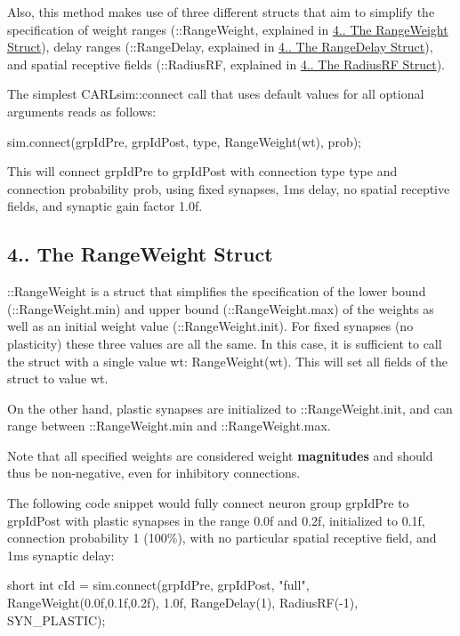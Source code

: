 Also, this method makes use of three different structs that aim to simplify the specification of weight ranges (\+::\+Range\+Weight, explained in \hyperlink{ch4_connections_ch4s1s1_range_weight}{4.. The Range\+Weight Struct}), delay ranges (\+::\+Range\+Delay, explained in \hyperlink{ch4_connections_ch4s1s2_range_delay}{4.. The Range\+Delay Struct}), and spatial receptive fields (\+::\+Radius\+RF, explained in \hyperlink{ch4_connections_ch4s1s3_radiusRF}{4.. The Radius\+RF Struct}).

The simplest C\+A\+R\+Lsim\+::connect call that uses default values for all optional arguments reads as follows\+: 
\begin{DoxyCode}
sim.connect(grpIdPre, grpIdPost, type, RangeWeight(wt), prob);
\end{DoxyCode}
 This will connect {\ttfamily grp\+Id\+Pre} to {\ttfamily grp\+Id\+Post} with connection type {\ttfamily type} and connection probability {\ttfamily prob}, using fixed synapses, 1ms delay, no spatial receptive fields, and synaptic gain factor 1.\+0f.\hypertarget{ch4_connections_ch4s1s1_range_weight}{}\subsection{4.. The Range\+Weight Struct}\label{ch4_connections_ch4s1s1_range_weight}
\+::\+Range\+Weight is a struct that simplifies the specification of the lower bound (\+::\+Range\+Weight.\+min) and upper bound (\+::\+Range\+Weight.\+max) of the weights as well as an initial weight value (\+::\+Range\+Weight.\+init). For fixed synapses (no plasticity) these three values are all the same. In this case, it is sufficient to call the struct with a single value {\ttfamily wt}\+: {\ttfamily Range\+Weight(wt)}. This will set all fields of the struct to value {\ttfamily wt}.

On the other hand, plastic synapses are initialized to \+::\+Range\+Weight.\+init, and can range between \+::\+Range\+Weight.\+min and \+::\+Range\+Weight.\+max.

Note that all specified weights are considered weight {\bfseries magnitudes} and should thus be non-\/negative, even for inhibitory connections.

The following code snippet would fully connect neuron group {\ttfamily grp\+Id\+Pre} to {\ttfamily grp\+Id\+Post} with plastic synapses in the range 0.\+0f and 0.\+2f, initialized to 0.\+1f, connection probability 1 (100\%), with no particular spatial receptive field, and 1ms synaptic delay\+: 
\begin{DoxyCode}
\textcolor{keywordtype}{short} \textcolor{keywordtype}{int} cId = sim.connect(grpIdPre, grpIdPost, \textcolor{stringliteral}{"full"}, RangeWeight(0.0f,0.1f,0.2f), 1.0f, RangeDelay(1),
    RadiusRF(-1), SYN\_PLASTIC);
\end{DoxyCode}


